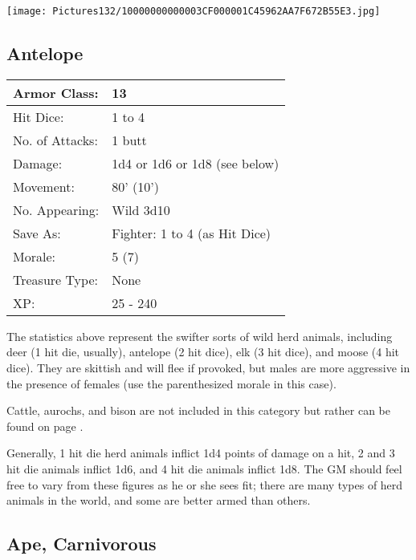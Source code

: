 \documentclass[a4paper,twoside,openany,10pt]{book}
\begin{document}
\begin{multicols}{2}
\vfill

\begin{center}
	\texttt{[image: Pictures132/10000000000003CF000001C45962AA7F672B55E3.jpg]}
\end{center}

\columnbreak

\subsection*{Antelope}\label{antelope}

\begin{tabularx}{0.48\textwidth}{ll}
Armor Class: & 13 \\\hline
Hit Dice: & 1 to 4 \\\hline
No. of Attacks: & 1 butt \\\hline
Damage: & 1d4 or 1d6 or 1d8 (see below) \\\hline
Movement: & 80' (10') \\\hline
No. Appearing: & Wild 3d10 \\\hline
Save As: & Fighter: 1 to 4 (as Hit Dice) \\\hline
Morale: & 5 (7) \\\hline
Treasure Type: & None \\\hline
XP: & 25 - 240 \\\hline
\end{tabularx}\medskip

The statistics above represent the swifter sorts of wild herd animals, including deer (1 hit die, usually), antelope (2 hit dice), elk (3 hit dice), and moose (4 hit dice). They are skittish and will flee if provoked, but males are more aggressive in the presence of females (use the parenthesized morale in this case).

Cattle, aurochs, and bison are not included in this category but rather can be found on page \hyperlink{cattle-including-aurochs-and-bison}{\pageref{cattle-including-aurochs-and-bison}}. 

Generally, 1 hit die herd animals inflict 1d4 points of damage on a hit, 2 and 3 hit die animals inflict 1d6, and 4 hit die animals inflict 1d8. The GM should feel free to vary from these figures as he or she sees fit; there are many types of herd animals in the world, and some are better armed than others.

\subsection*{Ape, Carnivorous}\label{ape-carnivorous}


\end{multicols}
\end{document}
